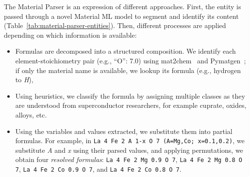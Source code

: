 The Material Parser is an expression of different approaches. 
First, the entity is passed through a novel Material ML model to segment and identify its content (Table~\ref{tab:material-parser-entities}).
Then, different processes are applied depending on which information is available: 
\begin{itemize}
    \item Formulas are decomposed into a structured composition. We identify each element-stoichiometry pair (e.g., ``O'': 7.0) using mat2chem~\cite{kononova2019text} and Pymatgen~\cite{Ong2013}; if only the material name is available, we lookup its formula (e.g., hydrogen to \textit{H}),
    \item Using heuristics, we classify the formula by assigning multiple classes as they are understood from superconductor researchers, for example cuprate, oxides, alloys, etc.
    \item Using the variables and values extracted, we substitute them into partial formulas. For example, in \texttt{La 4 Fe 2 A 1-x O 7 (A=Mg,Co; x=0.1,0.2)}, we substitute \textit{A} and \textit{x} using their parsed values, and applying permutations, we obtain four \textit{resolved formulas}: \texttt{La 4 Fe 2 Mg 0.9 O 7}, \texttt{La 4 Fe 2 Mg 0.8 O 7}, \texttt{La 4 Fe 2 Co 0.9 O 7}, and \texttt{La 4 Fe 2 Co 0.8 O 7}.
\end{itemize}

